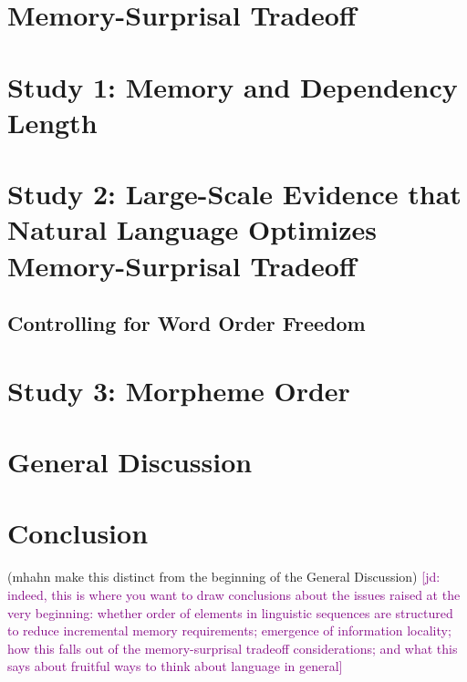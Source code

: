 \documentclass[11pt,letterpaper]{article}
\newcommand{\jd}[1]{\textcolor{Purple}{[jd: #1]}}
\newcommand\mhahn[1]{{\color{red}(mhahn #1)}}
\begin{document}



\section{Memory-Surprisal Tradeoff}\label{sec:ms-tradeoff}



\section{Study 1: Memory and Dependency Length}



%


\section{Study 2: Large-Scale Evidence that Natural Language Optimizes Memory-Surprisal Tradeoff}
\label{sec:main-experiment}



\subsection{Controlling for Word Order Freedom}\label{subsec:freedom}



\section{Study 3: Morpheme Order}




\section{General Discussion}




\section{Conclusion}

\mhahn{make this distinct from the beginning of the General Discussion} \jd{indeed, this is where you want to draw conclusions about the issues raised at the very beginning: whether order of elements in linguistic sequences are structured to reduce incremental memory requirements; emergence of information locality; how this falls out of the memory-surprisal tradeoff considerations; and what this says about fruitful ways to think about language in general}
\end{document}
